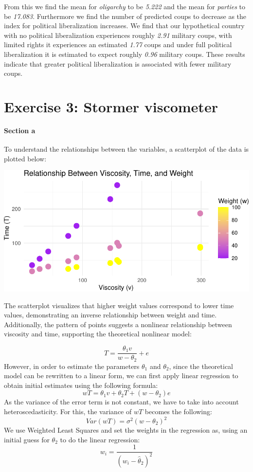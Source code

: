 \documentclass[
  11pt,
]{article}
\begin{document}
From this we find the mean for \emph{oligarchy} to be \emph{5.222} and
the mean for \emph{parties} to be \emph{17.083}. Furthermore we find the
number of predicted coups to decrease as the index for political
liberalization increases. We find that our hypothetical country with no
political liberalization experiences roughly \emph{2.91} military coups,
with limited rights it experiences an estimated \emph{1.77} coups and
under full political liberalization it is estimated to expect roughly
\emph{0.96} military coups. These results indicate that greater
political liberalization is associated with fewer military coups.

\section{Exercise 3: Stormer
viscometer}\label{exercise-3-stormer-viscometer}

\paragraph{Section a}\label{section-a-2}

To understand the relationships between the variables, a scatterplot of
the data is plotted below:

\includegraphics{ReportAssignment2_files/figure-latex/unnamed-chunk-20-1.pdf}

The scatterplot visualizes that higher weight values correspond to lower
time values, demonstrating an inverse relationship between weight and
time. Additionally, the pattern of points suggests a nonlinear
relationship between viscosity and time, supporting the theoretical
nonlinear model:

\[ 
T = \frac{\theta_1 v}{w - \theta_2} + e
\] However, in order to estimate the parameters \(\theta_1\) and
\(\theta_2\), since the theoretical model can be rewritten to a linear
form, we can first apply linear regression to obtain initial estimates
using the following formula: \[
wT = \theta_1 v + \theta_2 T + (w - \theta_2)e
\] As the variance of the error term is not constant, we have to take
into account heteroscedasticity. For this, the variance of \(wT\)
becomes the following: \[
Var(wT) = \sigma^2(w - \theta_2)^2
\] We use Weighted Least Squares and set the weights in the regression
as, using an initial guess for \(\theta_2\) to do the linear regression:
\[
w_i = \frac{1}{(w_i - \hat{\theta}_2)^2}
\]
\end{document}
